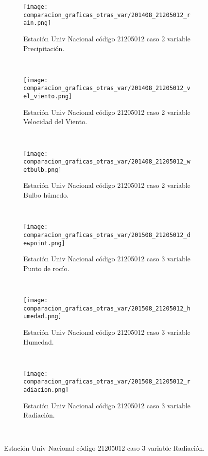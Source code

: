 \begin{figure}[H]
\centering
\begin{subfigure}[normla]{0.4\textwidth}
\caption{Estación Univ Nacional código 21205012 caso 2 variable Precipitación.}
\texttt{[image: comparacion\_graficas\_otras\_var/201408\_21205012\_rain.png]}
\end{subfigure}
~
\begin{subfigure}[normla]{0.4\textwidth}
\caption{Estación Univ Nacional código 21205012 caso 2 variable Velocidad del Viento.}
\texttt{[image: comparacion\_graficas\_otras\_var/201408\_21205012\_vel\_viento.png]}
\end{subfigure}
~
\begin{subfigure}[normla]{0.4\textwidth}
\caption{Estación Univ Nacional código 21205012 caso 2 variable Bulbo húmedo.}
\texttt{[image: comparacion\_graficas\_otras\_var/201408\_21205012\_wetbulb.png]}
\end{subfigure}
~
\begin{subfigure}[normla]{0.4\textwidth}
\caption{Estación Univ Nacional código 21205012 caso 3 variable Punto de rocío.}
\texttt{[image: comparacion\_graficas\_otras\_var/201508\_21205012\_dewpoint.png]}
\end{subfigure}
~
\begin{subfigure}[normla]{0.4\textwidth}
\caption{Estación Univ Nacional código 21205012 caso 3 variable Humedad.}
\texttt{[image: comparacion\_graficas\_otras\_var/201508\_21205012\_humedad.png]}
\end{subfigure}
~
\begin{subfigure}[normla]{0.4\textwidth}
\caption{Estación Univ Nacional código 21205012 caso 3 variable Radiación.}
\texttt{[image: comparacion\_graficas\_otras\_var/201508\_21205012\_radiacion.png]}
\end{subfigure}
~
\end{figure}
           
